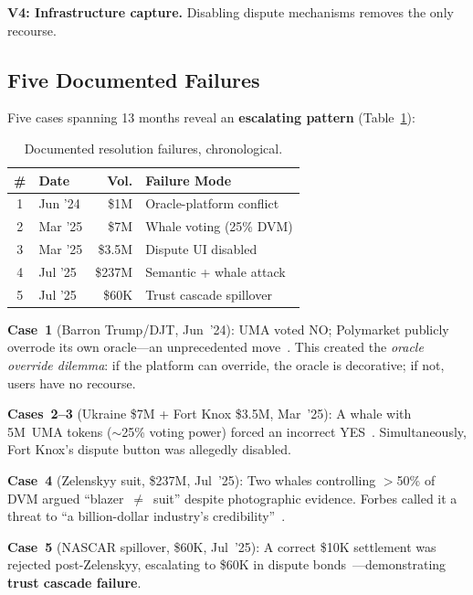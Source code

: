 \documentclass[11pt,a4paper,twocolumn]{article}
\begin{document}
\textbf{V4: Infrastructure capture.} Disabling dispute mechanisms removes the only recourse.

\subsection{Five Documented Failures}

Five cases spanning 13 months reveal an \textbf{escalating pattern} (Table~\ref{tab:failures}):

\begin{table}[h]
\centering
\caption{Documented resolution failures, chronological.}
\label{tab:failures}
\scriptsize
\begin{tabularx}{\columnwidth}{@{}clrX@{}}
\toprule
\textbf{\#} & \textbf{Date} & \textbf{Vol.} & \textbf{Failure Mode} \\
\midrule
1 & Jun '24 & \$1M & Oracle-platform conflict \\
2 & Mar '25 & \$7M & Whale voting (25\% DVM) \\
3 & Mar '25 & \$3.5M & Dispute UI disabled \\
4 & Jul '25 & \$237M & Semantic + whale attack \\
5 & Jul '25 & \$60K & Trust cascade spillover \\
\bottomrule
\end{tabularx}
\end{table}

\textbf{Case~1} (Barron Trump/DJT, Jun~'24): UMA voted NO; Polymarket publicly overrode its own oracle---an unprecedented move~\cite{reynolds2024}. This created the \emph{oracle override dilemma}: if the platform can override, the oracle is decorative; if not, users have no recourse.

\textbf{Cases~2--3} (Ukraine \$7M + Fort Knox \$3.5M, Mar~'25): A whale with 5M~UMA tokens ($\sim$25\% voting power) forced an incorrect YES~\cite{theblock2025,ccn2025}. Simultaneously, Fort Knox's dispute button was allegedly disabled.

\textbf{Case~4} (Zelenskyy suit, \$237M, Jul~'25): Two whales controlling $>$50\% of DVM argued ``blazer~$\neq$~suit'' despite photographic evidence. Forbes called it a threat to ``a billion-dollar industry's credibility''~\cite{forbes2025}.

\textbf{Case~5} (NASCAR spillover, \$60K, Jul~'25): A correct \$10K settlement was rejected post-Zelenskyy, escalating to \$60K in dispute bonds~\cite{cryptoslate2025}---demonstrating \textbf{trust cascade failure}.
\end{document}
